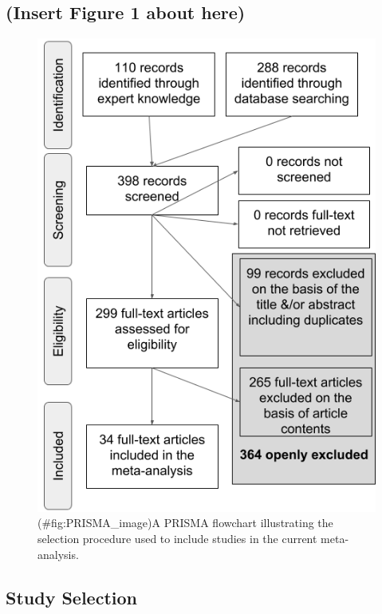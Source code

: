 \documentclass[man]{apa6}
\theoremstyle{definition}
\theoremstyle{definition}
\theoremstyle{definition}
\theoremstyle{remark}
\begin{document}
\subsection{(Insert Figure 1 about
here)}\label{insert-figure-1-about-here}

\begin{figure}
\centering
\includegraphics{figures/Figure_1_PRISMA_MA_Mispronunciation.png}
\caption{(\#fig:PRISMA\_image)A PRISMA flowchart illustrating the
selection procedure used to include studies in the current
meta-analysis.}
\end{figure}

\subsection{Study Selection}\label{study-selection}
\end{document}
